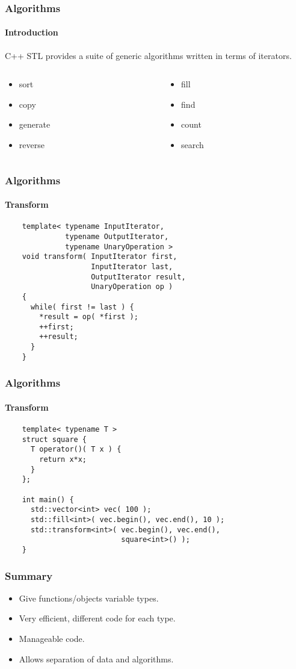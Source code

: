 \begin{frame}
  \frametitle{Algorithms}
  \framesubtitle{Introduction}
  C++ STL provides a suite of generic algorithms written in
  terms of iterators.
  \begin{columns}
    \begin{column}{.4\textwidth}
      \begin{itemize}
      \item sort
      \item copy
      \item generate
      \item reverse
      \end{itemize}
    \end{column}
    \begin{column}{.4\textwidth}
      \begin{itemize}
      \item fill
      \item find
      \item count
      \item search
      \end{itemize}
    \end{column}
  \end{columns}
\end{frame}

\begin{frame}[fragile]
  \frametitle{Algorithms}
  \framesubtitle{Transform}
  \begin{example}
    \begin{lstlisting}
    template< typename InputIterator,
              typename OutputIterator,
              typename UnaryOperation >
    void transform( InputIterator first,
                    InputIterator last,
                    OutputIterator result,
                    UnaryOperation op )
    {
      while( first != last ) {
        *result = op( *first );
        ++first;
        ++result;
      }
    }
    \end{lstlisting}
  \end{example}
\end{frame}

\begin{frame}[fragile]
  \frametitle{Algorithms}
  \framesubtitle{Transform}
  \begin{example}
    \begin{lstlisting}
    template< typename T >
    struct square {
      T operator()( T x ) {
        return x*x;
      }
    };

    int main() {
      std::vector<int> vec( 100 );
      std::fill<int>( vec.begin(), vec.end(), 10 );
      std::transform<int>( vec.begin(), vec.end(),
                           square<int>() );
    }
    \end{lstlisting}
  \end{example}
\end{frame}

\begin{frame}[fragile]
  \frametitle{Summary}
    \begin{itemize}
    \item Give functions/objects variable types.
    \item Very efficient, different code for each type.
    \item Manageable code.
    \item Allows separation of data and algorithms.
    \end{itemize}
\end{frame}
